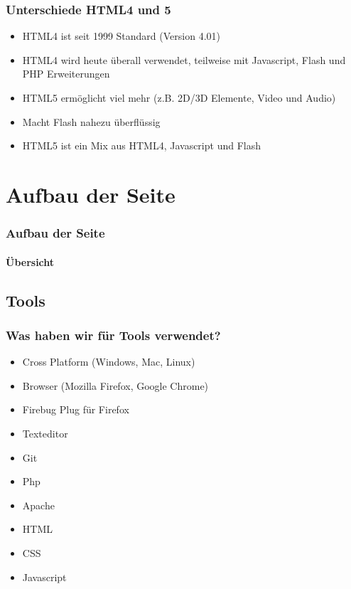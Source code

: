 \documentclass[xcolor=dvipsnames]{beamer}
\begin{document}
\begin{frame} %
  \frametitle{Unterschiede HTML4 und 5} %
  \begin{block}{}
	\begin{itemize}
		\item HTML4 ist seit 1999 Standard (Version 4.01)
		\item HTML4 wird heute überall verwendet, teilweise mit Javascript, Flash und PHP Erweiterungen
		\item HTML5 ermöglicht viel mehr (z.B. 2D/3D Elemente, Video und Audio)
		\item Macht Flash nahezu überflüssig
		\item HTML5 ist ein Mix aus HTML4, Javascript und Flash
	\end{itemize}
  \end{block}
\end{frame}


\section{Aufbau der Seite}
\begin{frame} %
  \frametitle{Aufbau der Seite} %
  \framesubtitle{Übersicht} %
\end{frame}


\subsection{Tools}
\begin{frame} %
  \frametitle{Was haben wir für Tools verwendet?} %
  \begin{block}{}
	  \begin{itemize}
		\item Cross Platform (Windows, Mac, Linux)
		\item Browser (Mozilla Firefox, Google Chrome)  	
		\item Firebug Plug für Firefox
  		\item Texteditor
	  	\item Git
		\item Php
		\item Apache
		\item HTML
		\item CSS
		\item Javascript
	  \end{itemize}
  \end{block}
\end{frame}
\end{document}
